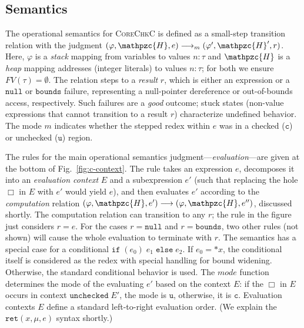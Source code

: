 \documentclass[conference]{IEEEtran}
\newcommand{\lang}{\textsc{CoreChkC}\xspace}
\newcommand{\kw}[1]{\ensuremath{\mathtt{#1}}}
\newcommand{\evalue}[2]{\ensuremath{{#1}\!:\!{#2}}}
\newcommand{\ret}[3]{\ensuremath{\kw{ret}({#1},{#2},{#3})}}
\newcommand{\estar}[1]{\ensuremath{\texttt{*}{#1}}}
\newcommand{\eunchecked}[1]{\ensuremath{\kw{unchecked}\;{#1}}}
\newcommand{\eif}[3]{\ensuremath{\kw{if\;}(#1)\;{#2}\;\kw{else}\;{#3}}}
\newcommand{\ebounds}{\ensuremath{\kw{bounds}}}
\newcommand{\enull}{\ensuremath{\kw{null}}}
\newcommand{\heap}{\ensuremath{\mathpzc{H}}}
\newcommand{\fv}{\mathit{FV}}
\newcommand{\cmode}{\texttt{c}}
\newcommand{\umode}{\texttt{u}}
\newcommand{\mode}{\textit{mode}}
\begin{document}
\subsection{Semantics}\label{sec:semantics}



The operational semantics for \lang is defined as a small-step
transition relation with the judgment $ (\varphi,\heap,e)
\longrightarrow_m (\varphi',\heap',r)$. Here, $\varphi$ is a
\emph{stack} mapping from variables to values $\evalue{n}{\tau}$ and
$\heap$ is a \emph{heap} mapping addresses (integer literals) to
values $\evalue{n}{\tau}$; for both we ensure
$\fv(\tau)=\emptyset$. The relation steps to a \emph{result} $r$,
which is either an expression or a $\enull$ or $\ebounds$ failure,
representing a null-pointer dereference or out-of-bounds access,
respectively. Such failures are a \emph{good} outcome; stuck states
(non-value expressions that cannot transition to a result $r$)
characterize undefined behavior.
The mode $m$ indicates whether the
stepped redex within $e$ was in a checked ($\cmode$) or
unchecked ($\umode$) region.

The rules for the main operational semantics judgment---\emph{evaluation}---are given at the bottom of
Fig.~\ref{fig:c-context}. The rule takes an expression $e$, decomposes
it into an \emph{evaluation context} $E$ and a subexpression $e'$
(such that replacing the hole $\Box$ in $E$ with $e'$ would yield
$e$), and then evaluates $e'$ according to the \emph{computation} relation $
(\varphi,\heap,e') \longrightarrow (\varphi,\heap,e'')$, discussed
shortly. The computation relation can transition to any $r$; the rule
in the figure just considers $r = e$. For the cases $r = \enull$ and
$r = \ebounds$, two other rules (not shown) will cause the whole
evaluation to terminate with $r$.  The semantics has a special case
for a conditional $\eif{e_0}{e_1}{e_2}$.  If $e_0=\estar{x}$, the
conditional itself is considered as the redex with special handling
for bound widening.  Otherwise, the standard conditional behavior is
used.
The $\mode$ function
determines the mode of the evaluating $e'$ based on the context $E$:
if the $\Box$ in $E$ occurs in context $\eunchecked{E'}$, the mode is
$\umode$, otherwise, it is $\cmode$. Evaluation contexts $E$ define a
standard left-to-right evaluation order. (We explain the
$\ret{x}{\mu}{e}$ syntax shortly.)
\end{document}
